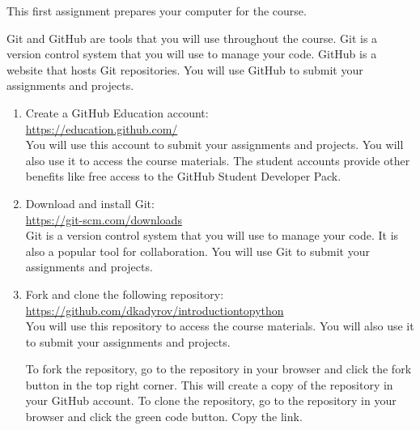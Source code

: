 \documentclass{homework}
\begin{document}
\maketitle

This first assignment prepares your computer for the course.\\

\begin{problem}

Git and GitHub are tools that you will use throughout the course. Git is a version control system that you will use to manage your code. GitHub is a website that hosts Git repositories. You will use GitHub to submit your assignments and projects.\\

\begin{enumerate}
    \item Create a GitHub Education account:\\
    
    \url{https://education.github.com/}\\
    
    You will use this account to submit your assignments and projects. You will also use it to access the course materials. The student accounts provide other benefits like free access to the GitHub Student Developer Pack.
    
    \item Download and install Git:\\

    \url{https://git-scm.com/downloads}\\
    
    Git is a version control system that you will use to manage your code. It is also a popular tool for collaboration. You will use Git to submit your assignments and projects.
    
    \item Fork and clone the following repository:\\

    \url{https://github.com/dkadyrov/introductiontopython}\\
    
    You will use this repository to access the course materials. You will also use it to submit your assignments and projects.

    To fork the repository, go to the repository in your browser and click the fork button in the top right corner. This will create a copy of the repository in your GitHub account. To clone the repository, go to the repository in your browser and click the green code button. Copy the link.


\end{enumerate}
\end{problem}
\end{document}
